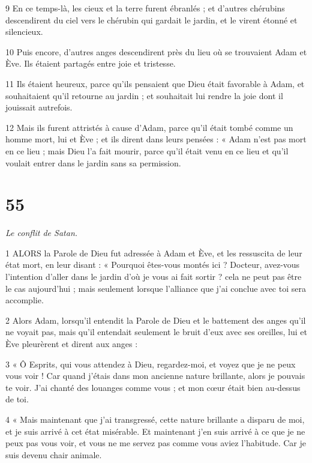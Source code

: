 \par 9 En ce temps-là, les cieux et la terre furent ébranlés ; et d'autres chérubins descendirent du ciel vers le chérubin qui gardait le jardin, et le virent étonné et silencieux.

\par 10 Puis encore, d'autres anges descendirent près du lieu où se trouvaient Adam et Ève. Ils étaient partagés entre joie et tristesse.

\par 11 Ils étaient heureux, parce qu'ils pensaient que Dieu était favorable à Adam, et souhaitaient qu'il retourne au jardin ; et souhaitait lui rendre la joie dont il jouissait autrefois.

\par 12 Mais ils furent attristés à cause d'Adam, parce qu'il était tombé comme un homme mort, lui et Ève ; et ils dirent dans leurs pensées : « Adam n'est pas mort en ce lieu ; mais Dieu l'a fait mourir, parce qu'il était venu en ce lieu et qu'il voulait entrer dans le jardin sans sa permission.



\chapter{55}

\par \textit{Le conflit de Satan.}

\par 1 ALORS la Parole de Dieu fut adressée à Adam et Ève, et les ressuscita de leur état mort, en leur disant : « Pourquoi êtes-vous montés ici ? Docteur, avez-vous l'intention d'aller dans le jardin d'où je vous ai fait sortir ? cela ne peut pas être le cas aujourd’hui ; mais seulement lorsque l’alliance que j’ai conclue avec toi sera accomplie.

\par 2 Alors Adam, lorsqu'il entendit la Parole de Dieu et le battement des anges qu'il ne voyait pas, mais qu'il entendait seulement le bruit d'eux avec ses oreilles, lui et Ève pleurèrent et dirent aux anges :

\par 3 « Ô Esprits, qui vous attendez à Dieu, regardez-moi, et voyez que je ne peux vous voir ! Car quand j'étais dans mon ancienne nature brillante, alors je pouvais te voir. J'ai chanté des louanges comme vous ; et mon cœur était bien au-dessus de toi.

\par 4 « Mais maintenant que j'ai transgressé, cette nature brillante a disparu de moi, et je suis arrivé à cet état misérable. Et maintenant j’en suis arrivé à ce que je ne peux pas vous voir, et vous ne me servez pas comme vous aviez l’habitude. Car je suis devenu chair animale.

